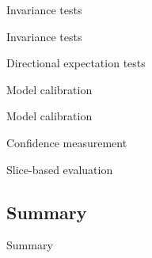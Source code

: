 \begin{frame}{Invariance tests}
  \begin{tddef}{Invariance tests}
  \end{tddef}
\end{frame}

\begin{frame}{Directional expectation tests}
  \begin{withmargin}
    \begin{tdmain}
    \end{tdmain}
    \begin{tdmargin}
    \end{tdmargin}
  \end{withmargin}
\end{frame}

\begin{frame}{Model calibration}
  \begin{tdcodet}{Model calibration}
  \end{tdcodet}
\end{frame}

\begin{frame}{Confidence measurement}
  \begin{withmargin}
    \begin{tdmain}
    \end{tdmain}
    \begin{tdmargin}
    \end{tdmargin}
  \end{withmargin}
\end{frame}

\begin{frame}{Slice-based evaluation}
  \begin{withmargin}
    \begin{tdmain}
    \end{tdmain}
    \begin{tdmargin}
    \end{tdmargin}
  \end{withmargin}
  \begin{takeaway}
  \end{takeaway}
\end{frame}

\subsection{Summary}

\begin{frame}{Summary}
  \begin{takeaway}
  \end{takeaway}
\end{frame}

\chapterreferences
